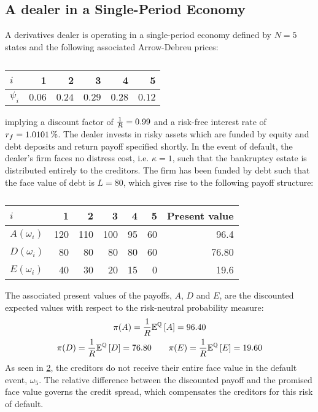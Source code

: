 \documentclass[main.tex]{subfiles}
\begin{document}
    \subsection{A dealer in a Single-Period Economy}

    A derivatives dealer is operating in a single-period economy
    defined by $N=5$ states and the following associated Arrow-Debreu prices:
        \begin{table}[H]
            \centering
            \begin{tabular}{l|rrrrr}
                $i$ & 1 & 2 & 3 & 4 & 5 \\
                \hline
                $\psi_{i}$ & $\num{0.06}$ & $\num{0.24}$ & $\num{0.29}$ & $\num{0.28}$ & $\num{0.12}$ \\
            \end{tabular}
            \caption{}
            \label{tbl:example-firm-structure}
        \end{table}
    implying a discount factor of $\frac{1}{R} = \num{0.99}$ and a risk-free interest rate of $\rfrate = \pct{0.010101}$.
    The dealer invests in risky assets 
    which are funded by equity and debt deposits and return payoff specified shortly.
    In the event of default, the dealer's firm faces no distress cost, i.e. $\kappa = 1$, 
    such that the bankruptcy estate is distributed entirely to the creditors.
    The firm has been funded by debt such that the face value of debt is $L=\num{80}$, 
    which gives rise to the following payoff structure:
    \begin{table}[H]
        \centering
        \begin{tabular}{l|rrrrr||r}
            $i$ & 1 & 2 & 3 & 4 & 5 & Present value \\
            \hline
            $A(\omega_{i})$ & \num{120} & \num{110} & \num{100} & \num{95} & \num{60} & \num{96.4} \\
            $D(\omega_{i})$ & \num{80} & \num{80} & \num{80} & \num{80} & \num{60} & \num{76.80}\\
            $E(\omega_{i})$ & \num{40} & \num{30} & \num{20} & \num{15} & \num{0} & \num{19.6}
        \end{tabular}
        \caption{}
        \label{tbl:example-pre-project-capital-structure}
    \end{table}
    The associated present values of the payoffs, $A$, $D$ and $E$, 
    are the discounted expected values
    with respect to the risk-neutral probability measure:
        \begin{gather*}
            \pi(A) = \frac{1}{R} \mathbb{E}^{\mathbb{Q}}\left[A\right] = \num{96.40} \\
            \pi(D) = \frac{1}{R} \mathbb{E}^{\mathbb{Q}}\left[D\right] = \num{76.80}
            \qquad \pi(E) = \frac{1}{R} \mathbb{E}^{\mathbb{Q}}\left[E\right] = \num{19.60}
        \end{gather*}
    As seen in \cref{tbl:example-pre-project-capital-structure},
    the creditors do not receive their entire face value in the default event, $\omega_5$.
    The relative difference between the discounted payoff and the promised face value
    governs the credit spread, which compensates the creditors for this risk of default.
\end{document}
